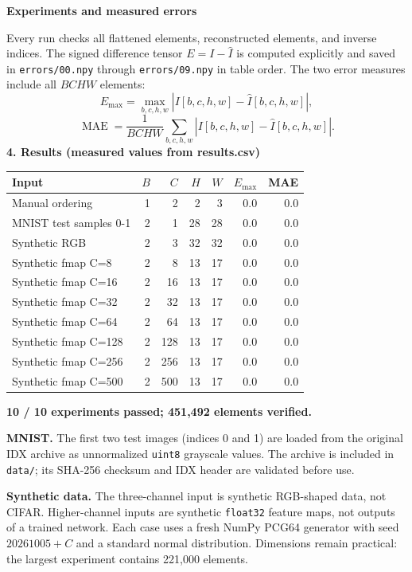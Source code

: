 \documentclass[11pt,a4paper]{article}
\newcommand{\reporttitle}[1]{{\LARGE\sffamily\bfseries\color{navy}#1}\par\medskip}
\newcommand{\reportsection}[1]{{\large\sffamily\bfseries\color{teal}#1}\par}
\newcommand{\ElementCount}{451,492}
\begin{document}
\newpage
\reporttitle{Experiments and measured errors}
Every run checks all flattened elements, reconstructed elements, and inverse
indices. The signed difference tensor $E=I-\widehat I$ is computed explicitly
and saved in \texttt{errors/00.npy} through \texttt{errors/09.npy} in table order.
The two error measures include all $BCHW$ elements:
\[
E_{\max}=\max_{b,c,h,w}|I[b,c,h,w]-\widehat I[b,c,h,w]|,
\]
\[
\operatorname{MAE}=\frac{1}{BCHW}
\sum_{b,c,h,w}|I[b,c,h,w]-\widehat I[b,c,h,w]|.
\]
\reportsection{4. Results (measured values from results.csv)}
\begin{center}
\renewcommand{\arraystretch}{1.4}
\begin{tabular}{lrrrrrr}
\toprule
Input & $B$ & $C$ & $H$ & $W$ & $E_{\max}$ & MAE \\
\midrule
Manual ordering & 1 & 2 & 2 & 3 & 0.0 & 0.0 \\
MNIST test samples 0-1 & 2 & 1 & 28 & 28 & 0.0 & 0.0 \\
Synthetic RGB & 2 & 3 & 32 & 32 & 0.0 & 0.0 \\
Synthetic fmap C=8 & 2 & 8 & 13 & 17 & 0.0 & 0.0 \\
Synthetic fmap C=16 & 2 & 16 & 13 & 17 & 0.0 & 0.0 \\
Synthetic fmap C=32 & 2 & 32 & 13 & 17 & 0.0 & 0.0 \\
Synthetic fmap C=64 & 2 & 64 & 13 & 17 & 0.0 & 0.0 \\
Synthetic fmap C=128 & 2 & 128 & 13 & 17 & 0.0 & 0.0 \\
Synthetic fmap C=256 & 2 & 256 & 13 & 17 & 0.0 & 0.0 \\
Synthetic fmap C=500 & 2 & 500 & 13 & 17 & 0.0 & 0.0 \\
\bottomrule
\end{tabular}
\end{center}
\textbf{10 / 10 experiments passed; \ElementCount{} elements verified.}

\textbf{MNIST.} The first two test images (indices 0 and 1) are loaded from
the original IDX archive as unnormalized \texttt{uint8} grayscale values.
The archive is included in \texttt{data/}; its SHA-256 checksum and IDX header
are validated before use.

\textbf{Synthetic data.} The three-channel input is synthetic RGB-shaped data,
not CIFAR. Higher-channel inputs are synthetic \texttt{float32} feature maps,
not outputs of a trained network. Each case uses a fresh NumPy PCG64 generator
with seed $20261005+C$ and a standard normal distribution. Dimensions remain
practical: the largest experiment contains 221,000 elements.
\end{document}
